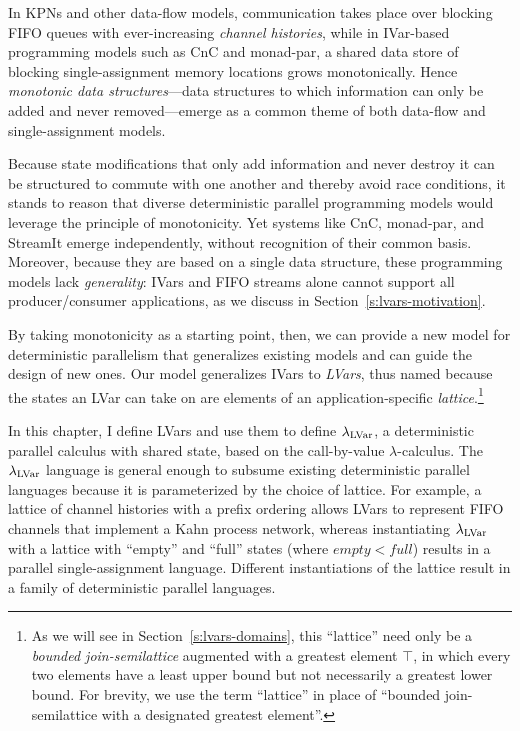 \noindent In KPNs and other data-flow models, communication takes
place over blocking FIFO queues with ever-increasing \emph{channel
  histories}, while in IVar-based programming models such as CnC and
monad-par, a shared data store of blocking single-assignment memory
locations grows monotonically.  Hence \emph{monotonic data
  structures}---data structures to which information can only be added
and never removed---emerge as a common theme of both data-flow and
single-assignment models.

Because state modifications that only add information and never
destroy it can be structured to commute with one another and thereby
avoid race conditions, it stands to reason that diverse deterministic
parallel programming models would leverage the principle of
monotonicity.  Yet systems like CnC, monad-par, and StreamIt emerge
independently, without recognition of their common basis.  Moreover,
because they are based on a single data structure, these programming
models lack \emph{generality}: IVars and FIFO streams alone cannot
support all producer/consumer applications, as we discuss in
Section~\ref{s:lvars-motivation}.

By taking monotonicity as a starting point, then, we can provide a new
model for deterministic parallelism that generalizes existing models
and can guide the design of new ones.  Our model generalizes IVars to
\emph{LVars}, thus named because the states an LVar can take on are
elements of an application-specific {\em lattice}.\footnote{ As we
  will see in Section~\ref{s:lvars-domains}, this ``lattice'' need
  only be a {\em bounded join-semilattice} augmented with a greatest
  element $\top$, in which every two elements have a least upper bound
  but not necessarily a greatest lower bound.  For brevity, we use the
  term ``lattice'' in place of ``bounded join-semilattice with a
  designated greatest element''.}

In this chapter, I define LVars and use them to define $\lambda_{\textrm{LVar}}$,
a deterministic parallel calculus with shared state, based on the
call-by-value $\lambda$-calculus.  The $\lambda_{\textrm{LVar}}$ language is
general enough to subsume existing deterministic parallel languages
because it is parameterized by the choice of lattice.  For example, a
lattice of channel histories with a prefix ordering allows LVars to
represent FIFO channels that implement a Kahn process network, whereas
instantiating $\lambda_{\textrm{LVar}}$ with a lattice with ``empty'' and ``full''
states (where $\mathit{empty} < \mathit{full}$) results in a parallel
single-assignment language.  Different instantiations of the lattice
result in a family of deterministic parallel languages.

